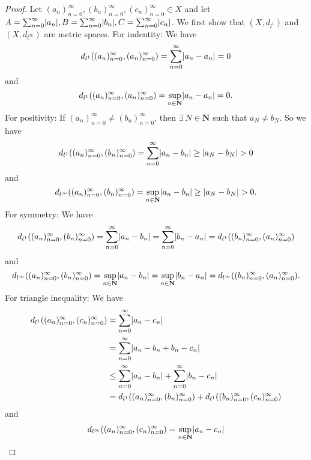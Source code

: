 \begin{proof}
    Let \((a_n)_{n = 0}^\infty, (b_n)_{n = 0}^\infty, (c_n)_{n = 0}^\infty \in X\) and let \(A = \sum_{n = 0}^\infty \abs*{a_n}, B = \sum_{n = 0}^\infty \abs*{b_n}, C = \sum_{n = 0}^\infty \abs*{c_n}\).
    We first show that \((X, d_{l^1})\) and \((X, d_{l^\infty})\) are metric spaces.
    For indentity:
    We have
    \[
        d_{l^1}((a_n)_{n = 0}^\infty, (a_n)_{n = 0}^\infty) = \sum_{n = 0}^\infty \abs*{a_n - a_n} = 0
    \]
    and
    \[
        d_{l^1}((a_n)_{n = 0}^\infty, (a_n)_{n = 0}^\infty) = \sup_{n \in \mathbf{N}} \abs*{a_n - a_n} = 0.
    \]
    For positivity:
    If \((a_n)_{n = 0}^\infty \neq (b_n)_{n = 0}^\infty\), then \(\exists\ N \in \mathbf{N}\) such that \(a_N \neq b_N\).
    So we have
    \[
        d_{l^1}((a_n)_{n = 0}^\infty, (b_n)_{n = 0}^\infty) = \sum_{n = 0}^\infty \abs*{a_n - b_n} \geq \abs*{a_N - b_N} > 0
    \]
    and
    \[
        d_{l^\infty}((a_n)_{n = 0}^\infty, (b_n)_{n = 0}^\infty) = \sup_{n \in \mathbf{N}} \abs*{a_n - b_n} \geq \abs*{a_N - b_N} > 0.
    \]
    For symmetry:
    We have
    \[
        d_{l^1}((a_n)_{n = 0}^\infty, (b_n)_{n = 0}^\infty) = \sum_{n = 0}^\infty \abs*{a_n - b_n} = \sum_{n = 0}^\infty \abs*{b_n - a_n} = d_{l^1}((b_n)_{n = 0}^\infty, (a_n)_{n = 0}^\infty)
    \]
    and
    \[
        d_{l^\infty}((a_n)_{n = 0}^\infty, (b_n)_{n = 0}^\infty) = \sup_{n \in \mathbf{N}} \abs*{a_n - b_n} = \sup_{n \in \mathbf{N}} \abs*{b_n - a_n} = d_{l^\infty}((b_n)_{n = 0}^\infty, (a_n)_{n = 0}^\infty).
    \]
    For triangle inequality:
    We have
    \begin{align*}
        d_{l^1}((a_n)_{n = 0}^\infty, (c_n)_{n = 0}^\infty) & = \sum_{n = 0}^\infty \abs*{a_n - c_n}                                                                      \\
                                                            & = \sum_{n = 0}^\infty \abs*{a_n - b_n + b_n - c_n}                                                          \\
                                                            & \leq \sum_{n = 0}^\infty \abs*{a_n - b_n} + \sum_{n = 0}^\infty \abs*{b_n - c_n}                            \\
                                                            & = d_{l^1}((a_n)_{n = 0}^\infty, (b_n)_{n = 0}^\infty) + d_{l^1}((b_n)_{n = 0}^\infty, (c_n)_{n = 0}^\infty)
    \end{align*}
    and
    \begin{align*}
        d_{l^\infty}((a_n)_{n = 0}^\infty, (c_n)_{n = 0}^\infty) & = \sup_{n \in \mathbf{N}} \abs*{a_n - c_n}                                                                             \\

\end{align*}
\end{proof}
